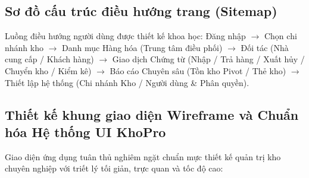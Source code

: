 \documentclass[12pt,a4paper]{report}
\renewcommand{\_}{\textunderscore\allowbreak}
\begin{document}
\subsection{Sơ đồ cấu trúc điều hướng trang (Sitemap)}
Luồng điều hướng người dùng được thiết kế khoa học:
Đăng nhập $\rightarrow$ Chọn chi nhánh kho $\rightarrow$ Danh mục Hàng hóa (Trung tâm điều phối) $\rightarrow$ Đối tác (Nhà cung cấp / Khách hàng) $\rightarrow$ Giao dịch Chứng từ (Nhập / Trả hàng / Xuất hủy / Chuyển kho / Kiểm kê) $\rightarrow$ Báo cáo Chuyên sâu (Tồn kho Pivot / Thẻ kho) $\rightarrow$ Thiết lập hệ thống (Chi nhánh Kho / Người dùng \& Phân quyền).

\subsection{Thiết kế khung giao diện Wireframe và Chuẩn hóa Hệ thống UI KhoPro}
Giao diện ứng dụng tuân thủ nghiêm ngặt chuẩn mực thiết kế quản trị kho chuyên nghiệp với triết lý tối giản, trực quan và tốc độ cao:
\end{document}

